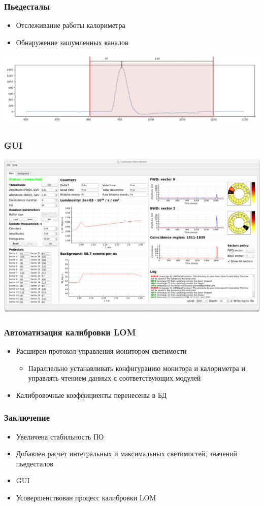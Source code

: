\documentclass{beamer}
\begin{document}
\begin{frame}
\frametitle{Пьедесталы}
    \begin{itemize}
        \item Отслеживание работы калориметра
        \item Обнаружение зашумленных каналов
    \end{itemize}
    \includegraphics[width=\textwidth]{Pedestal.png}
\end{frame}

\begin{frame}
\frametitle{GUI}
    \includegraphics[width=\textwidth]{GUI3}
\end{frame}

\begin{frame}
\frametitle{Автоматизация калибровки LOM}
    \begin{itemize}
        \item Расширен протокол управления монитором светимости
            \begin{itemize}
                \item Параллельно устанавливать конфигурацию монитора и калориметра и управлять чтением данных с соответствующих модулей
            \end{itemize}
        \item Калибровочные коэффициенты перенесены в БД
    \end{itemize}
\end{frame}

\begin{frame}
\frametitle{Заключение}
    \begin{itemize}
        \item Увеличена стабильность ПО
        \item Добавлен расчет интегральных и максимальных светимостей, значений пьедесталов
        \item GUI
        \item Усовершенствован процесс калибровки LOM
    \end{itemize}
\end{frame}
\end{document}
